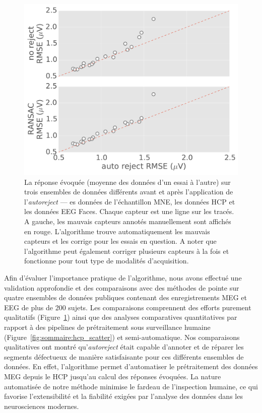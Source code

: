 \begin{figure}[htb!]
	\centering
	\includegraphics[width=0.9\linewidth]{figures/figure5.pdf}
    \caption[]{La réponse évoquée (moyenne des données d'un essai à l'autre) sur trois ensembles de données différents avant et après l'application de l'\emph{autoreject} --- es données de l'échantillon MNE, les données HCP et les données EEG Faces. Chaque capteur est une ligne sur les tracés. A gauche, les mauvais capteurs annotés manuellement sont affichés en rouge. L'algorithme trouve automatiquement les mauvais capteurs et les corrige pour les essais en question. A noter que l’algorithme peut également corriger plusieurs capteurs à la fois et fonctionne pour tout type de modalités d'acquisition.}
    \label{fig:sommaire:sample_evoked}
\end{figure}

Afin d'évaluer l'importance pratique de l'algorithme, nous avons effectué une validation approfondie et des comparaisons avec des méthodes de pointe sur quatre ensembles de données publiques contenant des enregistrements MEG et EEG de plus de 200 sujets. Les comparaisons comprennent des efforts purement qualitatifs (Figure~\ref{fig:sommaire:sample_evoked}) ainsi que des analyses comparatives quantitatives par rapport à des pipelines de prétraitement sous surveillance humaine (Figure~\ref{fig:sommaire:hcp_scatter}) et semi-automatique. Nos comparaisons qualitatives ont montré qu'\emph{autoreject} était capable d'annoter et de réparer les segments défectueux de manière satisfaisante pour ces différents ensembles de données. En effet, l'algorithme permet d'automatiser le prétraitement des données MEG depuis le HCP jusqu'au calcul des réponses évoquées. La nature automatisée de notre méthode minimise le fardeau de l'inspection humaine, ce qui favorise l'extensibilité et la fiabilité exigées par l'analyse des données dans les neurosciences modernes.

